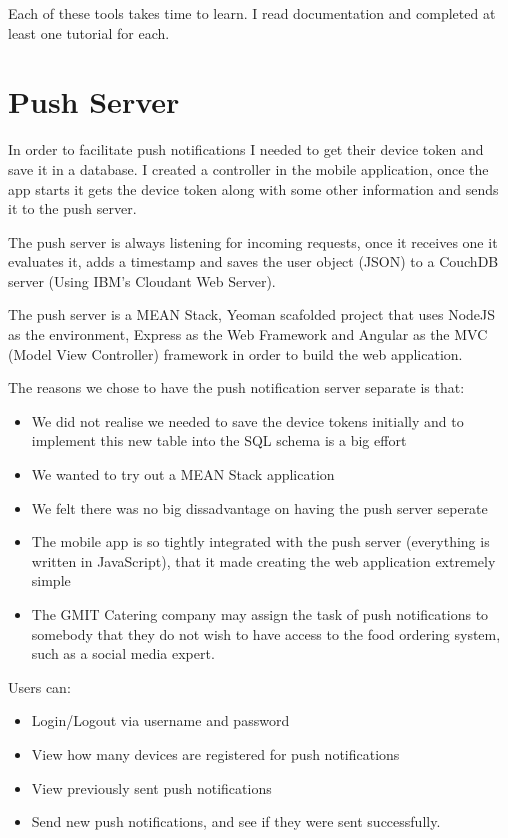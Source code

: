 Each of these tools takes time to learn. I read documentation and completed at least one tutorial for each.

\section{Push Server}
In order to facilitate push notifications I needed to get their device token and save it in a database.
I created a controller in the mobile application, once the app starts it gets the device token along with some other information and sends it to the push server.

The push server is always listening for incoming requests, once it receives one it evaluates it, adds a timestamp and saves the user object (JSON) to a CouchDB server (Using IBM's Cloudant Web Server).

The push server is a MEAN Stack, Yeoman scafolded project that uses NodeJS as the environment, Express as the Web Framework and Angular as the MVC (Model View Controller) framework in order to build the web application.
\linebreak

The reasons we chose to have the push notification server separate is that:
\begin{itemize}
\item We did not realise we needed to save the device tokens initially and to implement this new table into the SQL schema is a big effort
\item We wanted to try out a MEAN Stack application
\item We felt there was no big dissadvantage on having the push server seperate
\item The mobile app is so tightly integrated with the push server (everything is written in JavaScript), that it made creating the web application extremely simple
\item The GMIT Catering company may assign the task of push notifications to somebody that they do not wish to have access to the food ordering system, such as a social media expert. 
\end{itemize}

Users can:
\begin{itemize}
\item Login/Logout via username and password
\item View how many devices are registered for push notifications
\item View previously sent push notifications
\item Send new push notifications, and see if they were sent successfully.
\end{itemize}


